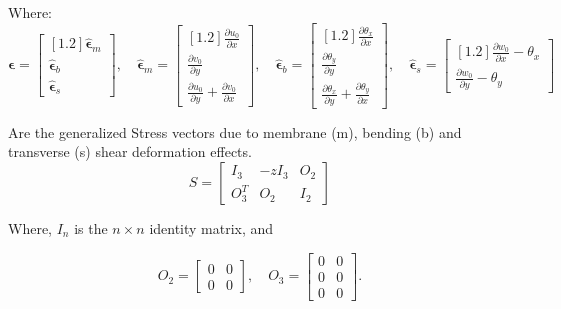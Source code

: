 Where:
$$
    \boldsymbol{\epsilon} =
    \begin{bmatrix}[1.2]
    \widehat{\boldsymbol{\epsilon}}_{m} \\
    \widehat{\boldsymbol{\epsilon}}_{b} \\
    \widehat{\boldsymbol{\epsilon}}_{s}
    \end{bmatrix}, \quad
    \widehat{\boldsymbol{\epsilon}}_{m} =
    \begin{bmatrix}[1.2]
    \frac{\partial u_{0}}{\partial x} \\
    \frac{\partial v_{0}}{\partial y} \\
    \frac{\partial u_{0}}{\partial y} + \frac{\partial v_{0}}{\partial x}
    \end{bmatrix}, \quad
    \widehat{\boldsymbol{\epsilon}}_{b} =
    \begin{bmatrix}[1.2]
    \frac{\partial\theta_{x}}{\partial x} \\
    \frac{\partial\theta_{y}}{\partial y} \\
    \frac{\partial\theta_{x}}{\partial y} + \frac{\partial\theta_{y}}{\partial x}
    \end{bmatrix}, \quad
    \widehat{\boldsymbol{\epsilon}}_{s} =
    \begin{bmatrix}[1.2]
    \frac{\partial w_{0}}{\partial x} - \theta_{x} \\
    \frac{\partial w_{0}}{\partial y} - \theta_{y}
    \end{bmatrix}
$$

Are the generalized Stress vectors due to membrane (m), bending (b) and
transverse (s) shear deformation effects.
\begin{equation}
    S =
    \begin{bmatrix}
    I_{3} & - z I_{3} & O_{2} \\[5pt]
    O_{3}^{T} & O_{2} & I_{2}
    \end{bmatrix}
\end{equation}

Where, $ I_{n} $ is the $n \times n$ identity matrix, and

\[
O_{2} =
\begin{bmatrix}
0 & 0 \\
0 & 0
\end{bmatrix}, \quad
O_{3} =
\begin{bmatrix}
0 & 0 \\
0 & 0 \\
0 & 0
\end{bmatrix}.
\]


